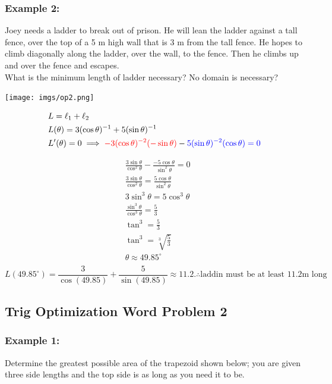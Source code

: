 \documentclass{article}
\begin{document}
\subsubsection*{Example 2:}
Joey needs a ladder to break out of prison. He will lean the ladder against a tall fence, over the top of a 5 m high wall that is 3 m from the tall fence. He hopes to climb diagonally along the ladder, over the wall, to the fence. Then he climbs up and over the fence and escapes.\\
What is the minimum length of ladder necessary? No domain is necessary? 


\begin{minipage}{0.5\textwidth}
  \centering
  \texttt{[image: imgs/op2.png]}
\end{minipage}%
\begin{minipage}{0.5\textwidth}
    \begin{align*}
        &L=\ell_1+\ell_2\\
        &L(\theta)=3(\cos\theta)^{-1}+5(\sin \theta)^{-1}\\
        &L'(\theta)=0 \implies \textcolor{red}{-3(\cos\theta)^{-2}(-\sin\theta)}-\textcolor{blue}{5(\sin \theta)^{-2}(\cos \theta)=0}
    \end{align*}
\end{minipage}
\begin{align*}
    &\frac{3\sin\theta}{\cos^2\theta}-\frac{-5\cos \theta}{\sin^2\theta}=0\\
    &\frac{3\sin \theta}{\cos^2\theta}=\frac{5\cos \theta}{\sin^2\theta}\\
    &3\sin^3\theta=5\cos^3\theta\\
    &\frac{\sin^3\theta}{\cos^3\theta}=\frac{5}{3}\\
    &\tan^3=\frac{5}{3}\\
    &\tan^3=\sqrt[3]{\frac{5}{3}}\\
    &\theta \approx49.85^{\circ}\\
\end{align*}
$$L(49.85^{\circ})=\frac{3}{\cos(49.85)}+\frac{5}{\sin(49.85)}\approx 11.2. \therefore \text{laddin must be at least 11.2m long} $$
\newpage 
\subsection{Trig Optimization Word Problem 2}
\subsubsection*{Example 1: }
Determine the greatest possible area of the trapezoid shown below; you are given three side lengths and the top side is as long as you need it to be.
\end{document}
